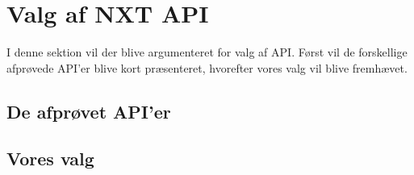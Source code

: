 \section{Valg af NXT API}
\label{nxt_api}

I denne sektion vil der blive argumenteret for valg af API.
Først vil de forskellige afprøvede API'er blive kort præsenteret, hvorefter vores valg vil blive fremhævet.

\subsection{De afprøvet API'er}


\subsection{Vores valg}
